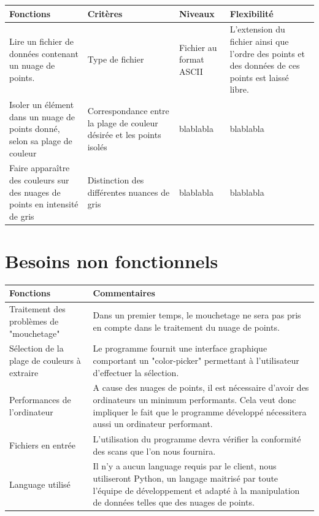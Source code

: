 \documentclass[12pt,titlepage]{report}
\begin{document}
\begin{tabular}{|p{6cm}|p{4cm}|p{3cm}|p{3cm}|}
  \hline
  Fonctions 
  & Critères 
  & Niveaux
  & Flexibilité \\
  \hline
  Lire un fichier de données contenant un nuage de points. 
  & Type de fichier 
  & Fichier au format ASCII
  & L'extension du fichier ainsi que l'ordre des points et des données de ces points est laissé libre. \\
  \hline
  Isoler un élément dans un nuage de points donné, selon sa plage de couleur 
  & Correspondance entre la plage de couleur désirée et les points isolés
  & blablabla
  & blablabla\\
  \hline
  Faire apparaître des couleurs sur des nuages de points en intensité de gris
  & Distinction des différentes nuances de gris
  & blablabla
  & blablabla\\
  \hline
\end{tabular}

\section{Besoins non fonctionnels}


\begin{tabular}{|p{6cm}|p{11cm}|}
    \hline
    Fonctions
    & Commentaires \\
    \hline
    Traitement des problèmes de "mouchetage"
    & Dans un premier temps, le mouchetage ne sera pas pris en compte dans le traitement du nuage de points.\\
    \hline
    Sélection de la plage de couleurs à extraire 
    & Le programme fournit une interface graphique comportant un "color-picker" permettant à l'utilisateur d'effectuer la sélection.\\
    \hline
    Performances de l'ordinateur
    & A cause des nuages de points, il est nécessaire d'avoir des ordinateurs un minimum performants. Cela veut donc impliquer le fait que le programme développé nécessitera aussi un ordinateur performant. \\
    \hline
    Fichiers en entrée
    & L'utilisation du programme devra vérifier la conformité des scans que l'on nous fournira. \\
    \hline
    Language utilisé
    & Il n'y a aucun language requis par le client, nous utiliseront Python, un langage maitrisé par toute l'équipe de développement et adapté à la manipulation de données telles que des nuages de points.\\
    \hline
\end{tabular}
\end{document}
